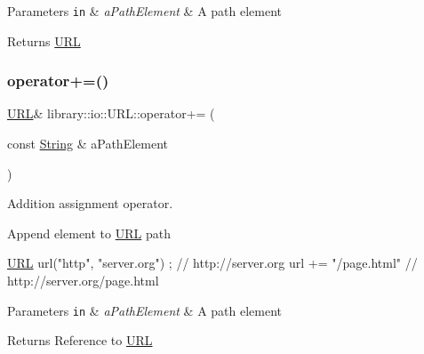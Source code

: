 \begin{DoxyParams}[1]{Parameters}
\mbox{\tt in}  & {\em a\+Path\+Element} & A path element \\
\hline
\end{DoxyParams}
\begin{DoxyReturn}{Returns}
\hyperlink{classlibrary_1_1io_1_1_u_r_l}{U\+RL} 
\end{DoxyReturn}
\mbox{\label{classlibrary_1_1io_1_1_u_r_l_ab93de936ef4e87658902051638d9f0a9}} 
\subsubsection{\texorpdfstring{operator+=()}{operator+=()}}
{\footnotesize\ttfamily \hyperlink{classlibrary_1_1io_1_1_u_r_l}{U\+RL}\& library\+::io\+::\+U\+R\+L\+::operator+= (\begin{DoxyParamCaption}\item[{const \hyperlink{namespacelibrary_1_1io_a7469b45835a4421045db344d6a5a1f85}{String} \&}]{a\+Path\+Element }\end{DoxyParamCaption})}



Addition assignment operator. 

Append element to \hyperlink{classlibrary_1_1io_1_1_u_r_l}{U\+RL} path


\begin{DoxyCode}
\hyperlink{classlibrary_1_1io_1_1_u_r_l_a7e9c070138a6dbd000ffb10b7cd8a5c4}{URL} url(\textcolor{stringliteral}{"http"}, \textcolor{stringliteral}{"server.org"}) ; \textcolor{comment}{// http://server.org}
url += \textcolor{stringliteral}{"/page.html"} \textcolor{comment}{// http://server.org/page.html}
\end{DoxyCode}



\begin{DoxyParams}[1]{Parameters}
\mbox{\tt in}  & {\em a\+Path\+Element} & A path element \\
\hline
\end{DoxyParams}
\begin{DoxyReturn}{Returns}
Reference to \hyperlink{classlibrary_1_1io_1_1_u_r_l}{U\+RL} 
\end{DoxyReturn}
\mbox{\label{classlibrary_1_1io_1_1_u_r_l_a4a3011126a94a48d022edda036560be1}} 
